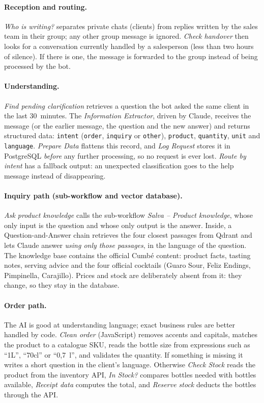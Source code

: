 \documentclass[11pt,a4paper]{article}
\newcommand{\nd}[1]{\emph{#1}}             %
\newcommand{\st}[1]{\texttt{#1}}           %
\begin{document}
\paragraph{Reception and routing.} \nd{Who is writing?} separates private chats (clients)
from replies written by the sales team in their group; any other group message is ignored.
\nd{Check handover} then looks for a conversation currently handled by a salesperson (less
than two hours of silence). If there is one, the message is forwarded to the group instead of
being processed by the bot.

\paragraph{Understanding.} \nd{Find pending clarification} retrieves a question the bot asked
the same client in the last 30~minutes. The \nd{Information Extractor}, driven by Claude,
receives the message (or the earlier message, the question and the new answer) and returns
structured data: \st{intent} (\st{order}, \st{inquiry} or \st{other}), \st{product},
\st{quantity}, \st{unit} and \st{language}. \nd{Prepare Data} flattens this record, and
\nd{Log Request} stores it in PostgreSQL \emph{before} any further processing, so no request is
ever lost. \nd{Route by intent} has a fallback output: an unexpected classification goes to the
help message instead of disappearing.

\paragraph{Inquiry path (sub-workflow and vector database).} \nd{Ask product knowledge}
calls the sub-workflow \nd{Salva -- Product knowledge}, whose only input is the question and
whose only output is the answer. Inside, a Question-and-Answer chain retrieves the four closest
passages from Qdrant and lets Claude answer \emph{using only those passages}, in the language of
the question. The knowledge base contains the official Cumbé content: product facts, tasting
notes, serving advice and the four official cocktails (Guaro Sour, Feliz Endings, Pimpinella,
Carajillo). Prices and stock are deliberately absent from it: they change, so they stay in the
database.

\paragraph{Order path.} The AI is good at understanding language; exact business rules are
better handled by code. \nd{Clean order} (JavaScript) removes accents and capitals, matches
the product to a catalogue SKU, reads the bottle size from expressions such as ``1L'', ``70cl'' or
``0,7~l'', and validates the quantity. If something is missing it writes a short question in the
client's language. Otherwise \nd{Check Stock} reads the product from the inventory API,
\nd{In Stock?} compares bottles needed with bottles available, \nd{Receipt data} computes
the total, and \nd{Reserve stock} deducts the bottles through the API.
\end{document}
